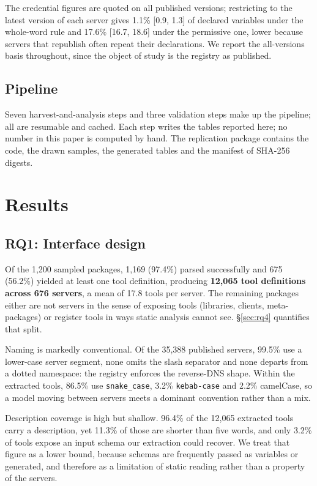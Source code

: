 \documentclass[a4paper,fleqn]{cas-dc}
\begin{document}
The credential figures are quoted on all published versions; restricting to the
latest version of each server gives 1.1\% [0.9, 1.3] of declared variables under
the whole-word rule and 17.6\% [16.7, 18.6] under the permissive one, lower
because servers that republish often repeat their declarations. We report the
all-versions basis throughout, since the object of study is the registry as
published.

\subsection{Pipeline}\label{sec:pipeline}

Seven harvest-and-analysis steps and three validation steps make up the
pipeline; all are resumable and cached. Each step writes the tables reported here; no number
in this paper is computed by hand. The replication package contains the code,
the drawn samples, the generated tables and the manifest of SHA-256 digests.

\section{Results}\label{sec:results}

\subsection{RQ1: Interface design}\label{sec:rq1}

Of the 1,200 sampled packages, 1,169 (97.4\%) parsed successfully and 675
(56.2\%) yielded at least one tool definition, producing \textbf{12,065 tool
definitions across 676 servers}, a mean of 17.8 tools per server. The
remaining packages either are not servers in the sense of exposing tools
(libraries, clients, meta-packages) or register tools in ways static analysis
cannot see. \S\ref{sec:rq4} quantifies that split.

Naming is markedly conventional. Of the 35,388 published servers, 99.5\% use a
lower-case server segment, none omits the slash separator and none departs from
a dotted namespace: the registry enforces the reverse-DNS shape. Within the
extracted tools, 86.5\% use \texttt{snake\_case}, 3.2\% \texttt{kebab-case} and
2.2\% camelCase, so a model moving between servers meets a dominant convention
rather than a mix.

Description coverage is high but shallow. 96.4\% of the 12,065 extracted tools
carry a description, yet 11.3\% of those are shorter than five words, and only
3.2\% of tools expose an input schema our extraction could recover. We treat
that figure as a lower bound, because schemas are frequently passed as
variables or generated, and therefore as a limitation of static reading rather
than a property of the servers.
\end{document}
